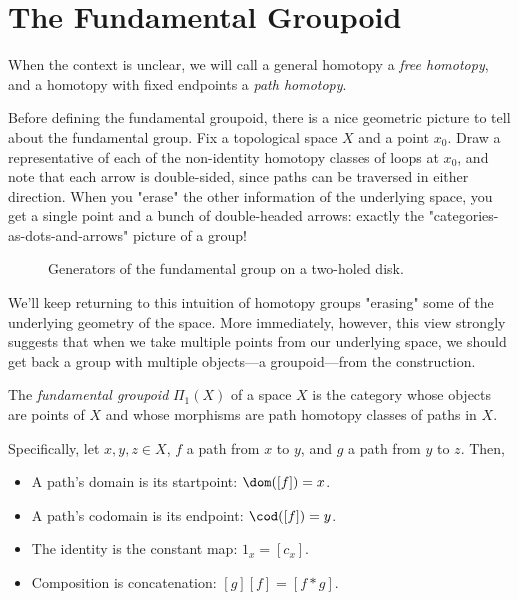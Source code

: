 \section{The Fundamental Groupoid}
\label{The Fundamental Group}

\begin{notation}
	When the context is unclear, we will call a general homotopy a \emph{free
		homotopy}, and a homotopy with fixed endpoints a \emph{path homotopy}.
\end{notation}

Before defining the fundamental groupoid, there is a nice geometric picture to
tell about the fundamental group. Fix a topological space $X$ and a point $x_0$.
Draw a representative of each of the non-identity homotopy classes of loops at
$x_0$, and note that each arrow is double-sided, since paths can be traversed in
either direction. When you "erase" the other information of the underlying
space, you get a single point and a bunch of double-headed arrows: exactly the
"categories-as-dots-and-arrows" picture of a group!

\begin{figure}[H]
	\centering
	
	\caption{Generators of the fundamental group on a two-holed disk.}
	\label{fig:group}
\end{figure}

We'll keep returning to this intuition of homotopy groups "erasing" some of the
underlying geometry of the space. More immediately, however, this view strongly
suggests that when we take multiple points from our underlying space, we should
get back a group with multiple objects---a groupoid---from the construction.

\begin{dfn}
	The \textit{fundamental groupoid} $\Pi_1(X)$ of a space $X$ is the category
	whose objects are points of $X$ and whose morphisms are path homotopy classes
	of paths in $X$.
\end{dfn}

Specifically, let $x,y,z\in X$, $f$ a path from $x$ to $y$, and $g$ a path from
$y$ to $z$. Then,

\begin{itemize}
	\item A path's domain is its startpoint: $\dom([f]) = x$.
	\item A path's codomain is its endpoint: $\cod([f]) = y$.
	\item The identity is the constant map: $1_x = [c_x]$.
	\item Composition is concatenation: $[g][f] = [f*g]$.
\end{itemize}

